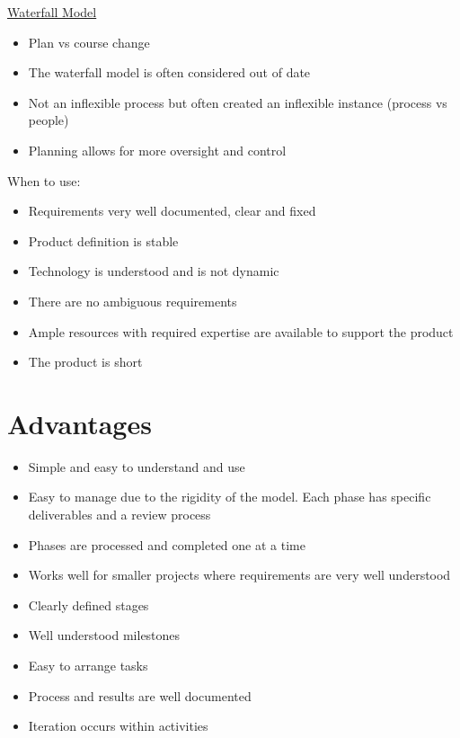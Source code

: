 \documentclass{article}[18pt]
\begin{document}
\begin{center}
\underline{\huge Waterfall Model}
\end{center}
\begin{itemize}
	\item Plan vs course change
	\item The waterfall model is often considered out of date
	\item Not an inflexible process but often created an inflexible instance (process vs people)
	\item Planning allows for more oversight and control
\end{itemize}
When to use:
\begin{itemize}
	\item Requirements very well documented, clear and fixed
	\item Product definition is stable
	\item Technology is understood and is not dynamic
	\item There are no ambiguous requirements
	\item Ample resources with required expertise are available to support the product
	\item The product is short
\end{itemize}
\section{Advantages}
\begin{itemize}
	\item Simple and easy to understand and use
	\item Easy to manage due to the rigidity of the model. Each phase has specific deliverables and a review process
	\item Phases are processed and completed one at a time
	\item Works well for smaller projects where requirements are very well understood
	\item Clearly defined stages
	\item Well understood milestones
	\item Easy to arrange tasks
	\item Process and results are well documented
	\item Iteration occurs within activities 
\end{itemize}
\end{document}
